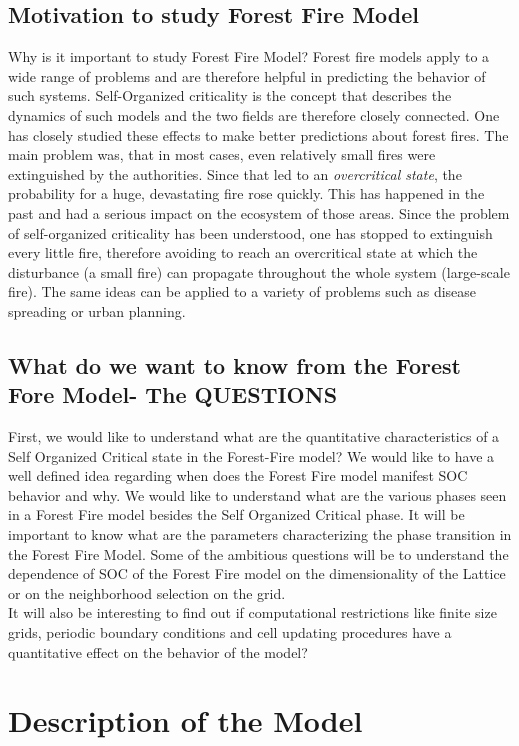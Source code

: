 \documentclass[11pt]{article}
\begin{document}
\subsection{Motivation to study Forest Fire Model}
Why is it important to study Forest Fire Model? Forest fire models apply to a wide range of problems and are therefore helpful in predicting the behavior of such systems. Self-Organized criticality is the concept that describes the dynamics of such models and the two fields are therefore closely connected. One has closely studied these effects to make better predictions about forest fires. The main problem was, that in most cases, even relatively small fires were extinguished by the authorities. Since that led to an \textit{overcritical state}, the probability for a huge, devastating fire rose quickly. This has happened in the past and had a serious impact on the ecosystem of those areas.
Since the problem of self-organized criticality has been understood, one has stopped to extinguish every little fire, therefore avoiding to reach an overcritical state at which the disturbance (a small fire) can propagate throughout the whole system (large-scale fire). 
The same ideas can be applied to a variety of problems such as disease spreading or urban planning.

\subsection{What do we want to know from the Forest Fore Model- The QUESTIONS}
First, we would like to understand what are the quantitative characteristics of a Self Organized Critical state in the Forest-Fire model? We would like to have a well defined idea regarding when does the Forest Fire model manifest SOC behavior and why. We would like to understand what are the various phases seen in a Forest Fire model besides the Self Organized Critical phase. It will be important to know what are the parameters characterizing the phase transition in the Forest Fire Model.
Some of the ambitious questions will be to understand the dependence of SOC of the Forest Fire model on the dimensionality of the Lattice or on the neighborhood selection on the grid.\\
It will also be interesting to find out if computational restrictions like finite size grids, periodic boundary conditions and cell updating procedures have a quantitative effect on the behavior of the model?



\section{Description of the Model}
\end{document}
